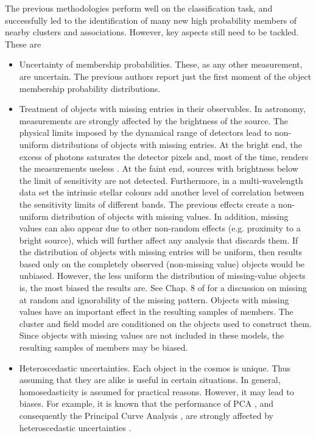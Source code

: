 The previous methodologies perform well on the classification task, and successfully led to the identification of many new high probability members of nearby clusters and associations. However, key aspects still need to be tackled. These are 
\begin{itemize}
\item Uncertainty of membership probabilities. These, as any other measurement, are uncertain. The previous authors report just the first moment of the object membership probability distributions.
\item Treatment of objects with missing entries in their observables. In astronomy, measurements are strongly affected by the brightness of the source. The physical limits imposed by the dynamical range of detectors lead to non-uniform distributions of objects with missing entries. At the bright end, the excess of photons saturates the detector pixels and, most of the time, renders the measurements useless \cite[however, see][ for examples of high-precision astrometry and photometry on saturated images]{2003hstc.conf..346M,2013AJ....146..106O}.  At the faint end, sources with brightness below the limit of sensitivity are not detected. Furthermore, in a multi-wavelength data set the intrinsic stellar colours add another level of correlation between the sensitivity limits of different bands. The previous effects create a non-uniform distribution of objects with missing values. In addition, missing values can also appear due to other non-random effects (e.g. proximity to a bright source), which will further affect any analysis that discards them. If the distribution of objects with missing entries will be uniform, then results based only on the completely observed (non-missing value) objects would be unbiased. However, the less uniform the distribution of missing-value objects is, the most biased the results are. See Chap. 8 of \citet{Gelman2013} for a discussion on missing at random and ignorability of the missing pattern. Objects with missing values have an important effect in the resulting samples of members. The cluster and field model are conditioned on the objects used to construct them. Since objects with missing values are not included in these models, the resulting samples of members may be biased.
\item Heteroscedastic uncertainties. Each object in the cosmos is unique. Thus assuming that they are alike is useful in certain situations. In general, homosedasticity is assumed for practical reasons. However, it may lead to biases. For example, it is known that the performance of PCA \cite[used by][]{KroneMartins2014}, and consequently the Principal Curve Analysis \cite[used by][]{Sarro2014}, are strongly affected by heteroscedastic uncertainties \citep{Hong2016}. 

\end{itemize}
